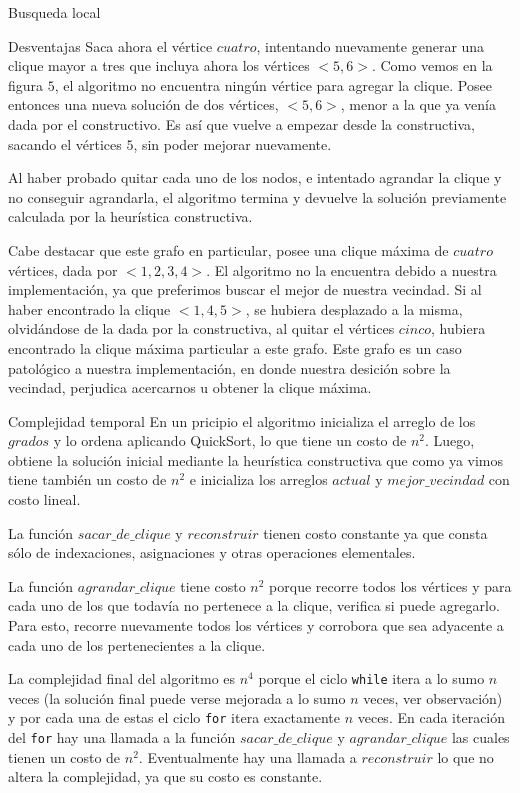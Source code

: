 \begin{section}{Busqueda local}
\begin{subsection}{Desventajas}
		Saca ahora el vértice $cuatro$, intentando nuevamente generar una clique mayor a tres que incluya ahora los vértices $<5,6>$. Como vemos en la figura $5$, el algoritmo no encuentra ningún vértice para agregar la clique. Posee entonces una nueva solución de dos vértices, $<5,6>$, menor a la que ya venía dada por el constructivo. Es así que vuelve a empezar desde la constructiva, sacando el vértices $5$, sin poder mejorar nuevamente.

		Al haber probado quitar cada uno de los nodos, e intentado agrandar la clique y no conseguir agrandarla, el algoritmo termina y devuelve la solución previamente calculada por la heurística constructiva.

		Cabe destacar que este grafo en particular, posee una clique máxima de $cuatro$ vértices, dada por $<1,2,3,4>$. El algoritmo no la encuentra debido a nuestra implementación, ya que preferimos buscar el mejor de nuestra vecindad. Si al haber encontrado la clique $<1,4,5>$, se hubiera desplazado a la misma, olvidándose de la dada por la constructiva, al quitar el vértices $cinco$, hubiera encontrado la clique máxima particular a este grafo. Este grafo es un caso patológico a nuestra implementación, en donde nuestra desición sobre la vecindad, perjudica acercarnos u obtener la clique máxima.

		\end{subsection}
		\begin{subsection}{Complejidad temporal}
			En un pricipio el algoritmo inicializa el arreglo de los $grados$ y lo ordena aplicando QuickSort, lo que tiene un costo de $n^2$. Luego, obtiene la solución inicial mediante la heurística constructiva que como ya vimos tiene también un costo de $n^2$ e inicializa los arreglos $actual$ y $mejor\_vecindad$ con costo lineal.

			La función $sacar\_de\_clique$ y $reconstruir$ tienen costo constante ya que consta sólo de indexaciones, asignaciones y otras operaciones elementales.

			La función $agrandar\_clique$ tiene costo $n^2$ porque recorre todos los vértices y para cada uno de los que todavía no pertenece a la clique, verifica si puede agregarlo. Para esto, recorre nuevamente todos los vértices y corrobora que sea adyacente a cada uno de los pertenecientes a la clique.

			La complejidad final del algoritmo es $n^4$ porque el ciclo \texttt{while} itera a lo sumo $n$ veces (la solución final puede verse mejorada a lo sumo $n$ veces, ver observación) y por cada una de estas el ciclo \texttt{for} itera exactamente $n$ veces. En cada iteración del \texttt{for} hay una llamada a la función $sacar\_de\_clique$ y $agrandar\_clique$ las cuales tienen un costo de $n^2$. Eventualmente hay una llamada a $reconstruir$ lo que no altera la complejidad, ya que su costo es constante.
			

\end{subsection}
\end{section}
